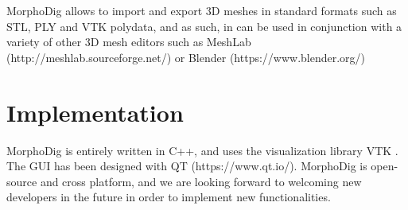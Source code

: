 \documentclass[12pt, a4paper]{book}
\begin{document}
 MorphoDig allows to import and export 3D meshes in standard formats such as STL, PLY and VTK polydata, and as such, in can be used in conjunction with a variety of other 3D mesh editors such  as MeshLab (http://meshlab.sourceforge.net/) or Blender (https://www.blender.org/) 
\section*{Implementation}
MorphoDig is entirely written in C++, and uses the visualization library VTK \citep{Avila2001}. The GUI has been designed with QT (https://www.qt.io/). MorphoDig is open-source and cross platform, and we are looking forward to welcoming new developers in the future in order to implement new functionalities. 


		 
		 		 
     
		 
	   
		 
		 
		 
		 
		 
		 
		 
		 
		 
		 

\cleardoublepage
{}

  		
\end{document}
